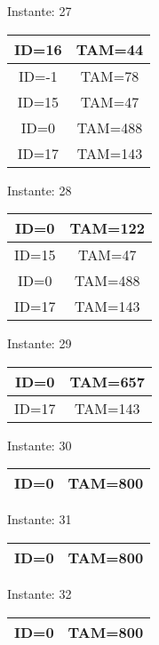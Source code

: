 \documentclass[10pt,a4paper]{article}
\begin{document}
\begin{center}

Instante: 27

\begin{tabular}{|c|c|}
\hline
ID=16 & TAM=44 \\ \hline
ID=-1 & TAM=78 \\ \hline
ID=15 & TAM=47 \\ \hline
ID=0 & TAM=488 \\ \hline
ID=17 & TAM=143 \\ \hline
\end{tabular}
\end{center}\pagebreak
\begin{center}

Instante: 28

\begin{tabular}{|c|c|}
\hline
ID=0 & TAM=122 \\ \hline
ID=15 & TAM=47 \\ \hline
ID=0 & TAM=488 \\ \hline
ID=17 & TAM=143 \\ \hline
\end{tabular}
\end{center}\pagebreak
\begin{center}

Instante: 29

\begin{tabular}{|c|c|}
\hline
ID=0 & TAM=657 \\ \hline
ID=17 & TAM=143 \\ \hline
\end{tabular}
\end{center}\pagebreak
\begin{center}

Instante: 30

\begin{tabular}{|c|c|}
\hline
ID=0 & TAM=800 \\ \hline
\end{tabular}
\end{center}\pagebreak
\begin{center}

Instante: 31

\begin{tabular}{|c|c|}
\hline
ID=0 & TAM=800 \\ \hline
\end{tabular}
\end{center}\pagebreak
\begin{center}

Instante: 32

\begin{tabular}{|c|c|}
\hline
ID=0 & TAM=800 \\ \hline
\end{tabular}
\end{center}\pagebreak
\end{document}
